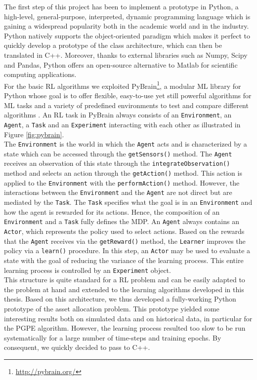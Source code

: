 The first step of this project has been to implement a prototype in Python, a high-level, general-purpose, interpreted, dynamic programming language which is gaining a widespread popularity both in the academic world and in the industry. Python natively supports the object-oriented paradigm which makes it perfect to quickly develop a prototype of the class architecture, which can then be translated in C++. Moreover, thanks to external libraries such as Numpy, Scipy and Pandas, Python offers an open-source alternative to Matlab for scientific computing applications.\\
For the basic RL algorithms we exploited PyBrain\footnote{\url{http://pybrain.org/}}, a modular ML library for Python whose goal is to offer flexible, easy-to-use yet still powerful algorithms for ML tasks and a variety of predefined environments to test and compare different algorithms \cite{pybrain2010jmlr}. An RL task in PyBrain always consists of an \lstinline{Environment}, an \lstinline{Agent}, a \lstinline{Task} and an \lstinline{Experiment} interacting with each other as illustrated in Figure \ref{fig:pybrain}.\\
The \lstinline{Environment} is the world in which the \lstinline{Agent} acts and is characterized by a state which can be accessed through the \lstinline{getSensors()} method. The \lstinline{Agent} receives an observation of this state through the \lstinline{integrateObservation()} method and selects an action through the \lstinline{getAction()} method. This action is applied to the \lstinline{Environment} with the \lstinline{performAction()} method. However, the interactions between the \lstinline{Environment} and the \lstinline{Agent} are not direct but are mediated by the \lstinline{Task}. The \lstinline{Task} specifies what the goal is in an \lstinline{Environment} and how the agent is rewarded for its actions. Hence, the composition of an \lstinline{Environment} and a \lstinline{Task} fully defines the MDP. An \lstinline{Agent} always contains an \lstinline{Actor}, which represents the policy used to select actions. Based on the rewards that the \lstinline{Agent} receives via the \lstinline{getReward()} method, the \lstinline{Learner} improves the policy via a \lstinline{learn()} procedure. In this step, an \lstinline{Actor} may be used to evaluate a state with the goal of reducing the variance of the learning process. This entire learning process is controlled by an \lstinline{Experiment} object.\\ 
This structure is quite standard for a RL problem and can be easily adapted to the problem at hand and extended to the learning algorithms developed in this thesis. Based on this architecture, we thus developed a fully-working Python prototype of the asset allocation problem. This prototype yielded some interesting results both on simulated data and on historical data, in particular for the PGPE algorithm. However, the learning process resulted too slow to be run systematically for a large number of time-steps and training epochs. By consequent, we quickly decided to pass to C++.
